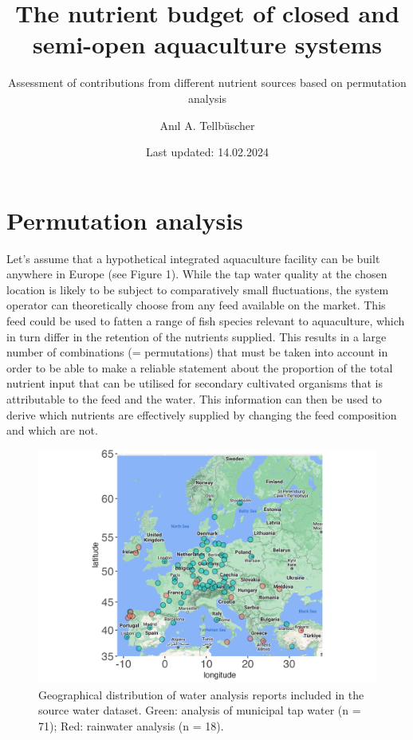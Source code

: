 \documentclass[
]{article}
\title{The nutrient budget of closed and semi-open aquaculture systems}
\subtitle{Assessment of contributions from different nutrient sources
based on permutation analysis}
\author{Anıl A. Tellbüscher}
\date{Last updated: 14.02.2024}
\begin{document}
\maketitle

\hypertarget{permutation-analysis}{%
\section{Permutation analysis}\label{permutation-analysis}}

Let's assume that a hypothetical integrated aquaculture facility can be
built anywhere in Europe (see Figure 1). While the tap water quality at
the chosen location is likely to be subject to comparatively small
fluctuations, the system operator can theoretically choose from any feed
available on the market. This feed could be used to fatten a range of
fish species relevant to aquaculture, which in turn differ in the
retention of the nutrients supplied. This results in a large number of
combinations (= permutations) that must be taken into account in order
to be able to make a reliable statement about the proportion of the
total nutrient input that can be utilised for secondary cultivated
organisms that is attributable to the feed and the water. This
information can then be used to derive which nutrients are effectively
supplied by changing the feed composition and which are not.

\begin{figure}
\includegraphics[width=1\linewidth]{../output/plots/map} \caption{Geographical distribution of water analysis reports included in the source water dataset. Green: analysis of municipal tap water (n = 71); Red: rainwater analysis (n = 18).}\label{fig:map}
\end{figure}
\end{document}

